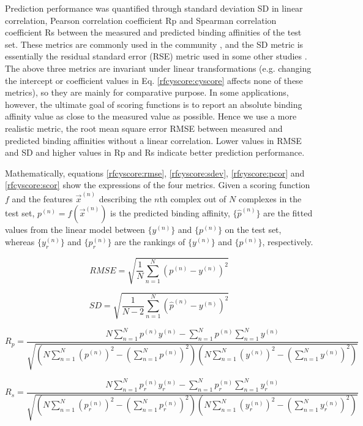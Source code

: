 Prediction performance was quantified through standard deviation SD in linear correlation, Pearson correlation coefficient Rp and Spearman correlation coefficient Rs between the measured and predicted binding affinities of the test set. These metrics are commonly used in the community \citep{1313}, and the SD metric is essentially the residual standard error (RSE) metric used in some other studies \citep{963}. The above three metrics are invariant under linear transformations (e.g. changing the intercept or coefficient values in Eq. \eqref{rfcyscore:cyscore} affects none of these metrics), so they are mainly for comparative purpose. In some applications, however, the ultimate goal of scoring functions is to report an absolute binding affinity value as close to the measured value as possible. Hence we use a more realistic metric, the root mean square error RMSE between measured and predicted binding affinities without a linear correlation. Lower values in RMSE and SD and higher values in Rp and Rs indicate better prediction performance.

Mathematically, equations \eqref{rfcyscore:rmse}, \eqref{rfcyscore:sdev}, \eqref{rfcyscore:pcor} and \eqref{rfcyscore:scor} show the expressions of the four metrics. Given a scoring function $f$ and the features $\overrightarrow{x}^{(n)}$ describing the $n$th complex out of $N$ complexes in the test set, $p^{(n)}=f(\overrightarrow{x}^{(n)})$ is the predicted binding affinity, $\{\hat{p}^{(n)}\}$ are the fitted values from the linear model between $\{y^{(n)}\}$ and $\{p^{(n)}\}$ on the test set, whereas $\{y_r^{(n)}\}$ and $\{p_r^{(n)}\}$ are the rankings of $\{y^{(n)}\}$ and $\{p^{(n)}\}$, respectively.

\begin{equation}
RMSE = \sqrt{\frac{1}{N}\sum_{n=1}^N(p^{(n)}-y^{(n)})^2}
\label{rfcyscore:rmse}
\end{equation}

\begin{equation}
SD = \sqrt{\frac{1}{N-2}\sum_{n=1}^N(\hat{p}^{(n)}-y^{(n)})^2}
\label{rfcyscore:sdev}
\end{equation}

\begin{equation}
R_p = \frac{N\sum_{n=1}^Np^{(n)}y^{(n)}-\sum_{n=1}^Np^{(n)}\sum_{n=1}^Ny^{(n)}}{\sqrt{(N\sum_{n=1}^N(p^{(n)})^2-(\sum_{n=1}^Np^{(n)})^2)(N\sum_{n=1}^N(y^{(n)})^2-(\sum_{n=1}^Ny^{(n)})^2)}}
\label{rfcyscore:pcor}
\end{equation}

\begin{equation}
R_s = \frac{N\sum_{n=1}^Np_r^{(n)}y_r^{(n)}-\sum_{n=1}^Np_r^{(n)}\sum_{n=1}^Ny_r^{(n)}}{\sqrt{(N\sum_{n=1}^N(p_r^{(n)})^2-(\sum_{n=1}^Np_r^{(n)})^2)(N\sum_{n=1}^N(y_r^{(n)})^2-(\sum_{n=1}^Ny_r^{(n)})^2)}}
\label{rfcyscore:scor}
\end{equation}

